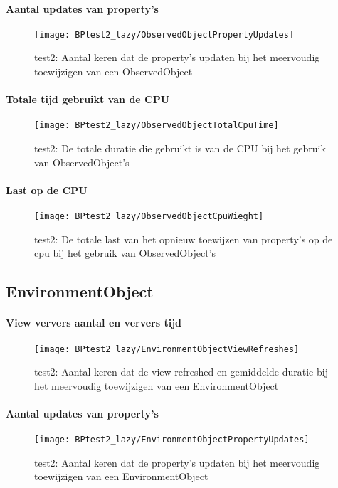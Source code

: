 \paragraph{Aantal updates van property's}
\begin{figure}[H]
    \centering
    \texttt{[image: BPtest2\_lazy/ObservedObjectPropertyUpdates]} 
    \caption{test2: Aantal keren dat de property's updaten bij het meervoudig toewijzigen van een ObservedObject}
    \label{fig:propertyUpdatesObservedObject2}
\end{figure}
\paragraph{Totale tijd gebruikt van de CPU}
\begin{figure}[H]
    \centering
    \texttt{[image: BPtest2\_lazy/ObservedObjectTotalCpuTime]} 
    \caption{test2: De totale duratie die gebruikt is van de CPU bij het gebruik van ObservedObject's}
    \label{fig:cpuUsageTimeObservedObject2}
\end{figure}
\paragraph{Last op de CPU}
\begin{figure}[H]
    \centering
    \texttt{[image: BPtest2\_lazy/ObservedObjectCpuWieght]} 
    \caption{test2: De totale last van het opnieuw toewijzen van property's op de cpu bij het gebruik van ObservedObject's}
    \label{fig:cpuWeightObservedObject2}
\end{figure}

\subsection{EnvironmentObject}
\paragraph{View ververs aantal en ververs tijd}
\begin{figure}[H]
    \centering
    \texttt{[image: BPtest2\_lazy/EnvironmentObjectViewRefreshes]} 
    \caption{test2: Aantal keren dat de view refreshed en gemiddelde duratie bij het meervoudig toewijzigen van een EnvironmentObject}
    \label{fig:viewRefreshesEnvironmentObject2}
\end{figure}
\paragraph{Aantal updates van property's}
\begin{figure}[H]
    \centering
    \texttt{[image: BPtest2\_lazy/EnvironmentObjectPropertyUpdates]} 
    \caption{test2: Aantal keren dat de property's updaten bij het meervoudig toewijzigen van een EnvironmentObject}
    \label{fig:propertyUpdatesEnvironmentObject2}
\end{figure}
